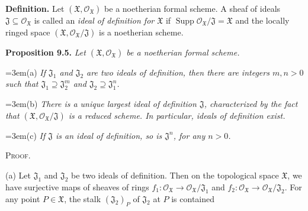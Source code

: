 {\medskip
\noindent\textbf{Definition.} Let $(\mathfrak X,\mathcal O_{\mathfrak X})$ be a noetherian formal scheme. A sheaf of ideals $\mathfrak J\subseteq\mathcal O_{\mathfrak X}$ is called an \emph{ideal of definition for $\mathfrak X$} if $\operatorname{Supp}\mathcal O_{\mathfrak X}/\mathfrak J=\mathfrak X$ and the locally ringed space $(\mathfrak X,\mathcal O_{\mathfrak X}/\mathfrak J)$ is a noetherian scheme.

\medskip
\noindent\hypertarget{result-II-9.5}{}\textbf{Proposition 9.5.} \emph{Let $(\mathfrak X,\mathcal O_{\mathfrak X})$ be a noetherian formal scheme.}

\noindent\hangindent=3em\hspace*{1.7em}\hypertarget{result-II-9.5-a}{}(a) \emph{If $\mathfrak J_1$ and $\mathfrak J_2$ are two ideals of definition, then there are integers $m,n>0$ such that $\mathfrak J_1\supseteq\mathfrak J_2^m$ and $\mathfrak J_2\supseteq\mathfrak J_1^n$.}

\noindent\hangindent=3em\hspace*{1.7em}\hypertarget{result-II-9.5-b}{}(b) \emph{There is a unique largest ideal of definition $\mathfrak J$, characterized by the fact that $(\mathfrak X,\mathcal O_{\mathfrak X}/\mathfrak J)$ is a reduced scheme. In particular, ideals of definition exist.}

\noindent\hangindent=3em\hspace*{1.7em}\hypertarget{result-II-9.5-c}{}(c) \emph{If $\mathfrak J$ is an ideal of definition, so is $\mathfrak J^n$, for any $n>0$.}

\smallskip
\noindent\textsc{Proof.}

(a) Let $\mathfrak J_1$ and $\mathfrak J_2$ be two ideals of definition. Then on the topological space $\mathfrak X$, we have surjective maps of sheaves of rings $f_1\colon\mathcal O_{\mathfrak X}\to\mathcal O_{\mathfrak X}/\mathfrak J_1$ and $f_2\colon\mathcal O_{\mathfrak X}\to\mathcal O_{\mathfrak X}/\mathfrak J_2$. For any point $P\in\mathfrak X$, the stalk $(\mathfrak J_2)_P$ of $\mathfrak J_2$ at $P$ is contained}
